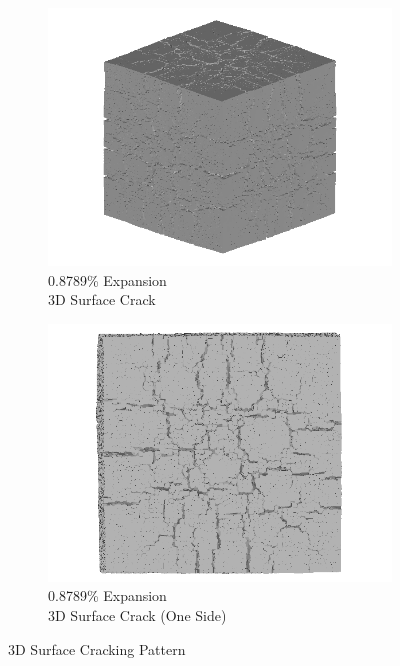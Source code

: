 \begin{figure}[ht!]
    \begin{subfigure}{.5\textwidth}
      \centering
      \includegraphics[width=0.5\linewidth]{Files/exp_3D/DEF/A30X0C_4_3d.png}
      \caption{0.8789\% Expansion\\3D Surface Crack}
    \end{subfigure}%
    \begin{subfigure}{.5\textwidth}
      \centering
      \includegraphics[width=0.5\linewidth]{Files/exp_3D/DEF/A30X0C_4_3ds.png}
      \caption{0.8789\% Expansion\\3D Surface Crack (One Side)}
    \end{subfigure}%

\caption{3D Surface Cracking Pattern}
\label{fig:A30_3Dcrack}
\end{figure}
